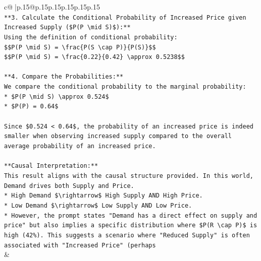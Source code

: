\documentclass{article}
\begin{document}
{\begin{supertabular}{c@{$\;$}|p{.15\linewidth}@{}p{.15\linewidth}p{.15\linewidth}p{.15\linewidth}p{.15\linewidth}p{.15\linewidth}}
{{{\\ 
\texttt{**3. Calculate the Conditional Probability of Increased Price given Increased Supply (\$P(P \textbackslash{}mid S)\$):**} \\
\texttt{Using the definition of conditional probability:} \\
\texttt{\$\$P(P \textbackslash{}mid S) = \textbackslash{}frac\{P(S \textbackslash{}cap P)\}\{P(S)\}\$\$} \\
\texttt{\$\$P(P \textbackslash{}mid S) = \textbackslash{}frac\{0.22\}\{0.42\} \textbackslash{}approx 0.5238\$\$} \\
\\ 
\texttt{**4. Compare the Probabilities:**} \\
\texttt{We compare the conditional probability to the marginal probability:} \\
\texttt{*   \$P(P \textbackslash{}mid S) \textbackslash{}approx 0.524\$} \\
\texttt{*   \$P(P) = 0.64\$} \\
\\ 
\texttt{Since \$0.524 < 0.64\$, the probability of an increased price is indeed smaller when observing increased supply compared to the overall average probability of an increased price.} \\
\\ 
\texttt{**Causal Interpretation:**} \\
\texttt{This result aligns with the causal structure provided. In this world, Demand drives both Supply and Price.} \\
\texttt{*   High Demand \$\textbackslash{}rightarrow\$ High Supply AND High Price.} \\
\texttt{*   Low Demand \$\textbackslash{}rightarrow\$ Low Supply AND Low Price.} \\
\texttt{*   However, the prompt states "Demand has a direct effect on supply and price" but also implies a specific distribution where \$P(R \textbackslash{}cap P)\$ is high (42\%). This suggests a scenario where "Reduced Supply" is often associated with "Increased Price" (perhaps} \\
            }
        }
    }
    & \\ \\


\end{supertabular}}
\end{document}
